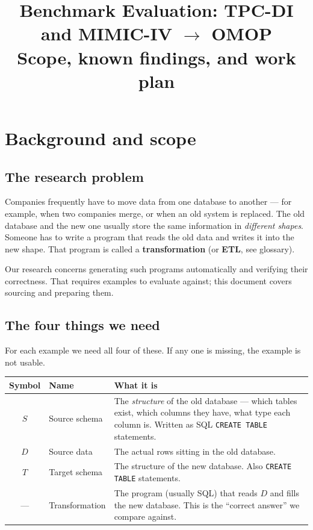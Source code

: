 \documentclass[11pt,a4paper]{article}
\title{\vspace{-1.5cm}\textbf{Benchmark Evaluation: TPC-DI and MIMIC-IV $\rightarrow$ OMOP}\\[4pt]
\large Scope, known findings, and work plan}
\author{}
\date{}
\newcommand{\code}[1]{\texttt{\small #1}}
\begin{document}
\maketitle
\vspace{-1.2cm}



\section{Background and scope}

\subsection{The research problem}

Companies frequently have to move data from one database to another --- for example, when
two companies merge, or when an old system is replaced. The old database and the new one
usually store the same information in \emph{different shapes}. Someone has to write a
program that reads the old data and writes it into the new shape. That program is called a
\textbf{transformation} (or \textbf{ETL}, see glossary).

Our research concerns generating such programs automatically and verifying their
correctness. That requires examples to evaluate against; this document covers sourcing and
preparing them.

\subsection{The four things we need}

For each example we need all four of these. If any one is missing, the example is not
usable.

\begin{center}
\begin{tabular}{@{}clL{9.2cm}@{}}
\toprule
\textbf{Symbol} & \textbf{Name} & \textbf{What it is} \\
\midrule
$S$ & Source schema & The \emph{structure} of the old database --- which tables exist, which columns they have, what type each column is. Written as SQL \code{CREATE TABLE} statements. \\
$D$ & Source data & The actual rows sitting in the old database. \\
$T$ & Target schema & The structure of the new database. Also \code{CREATE TABLE} statements. \\
--- & Transformation & The program (usually SQL) that reads $D$ and fills the new database. This is the ``correct answer'' we compare against. \\
\bottomrule
\end{tabular}
\end{center}
\end{document}
